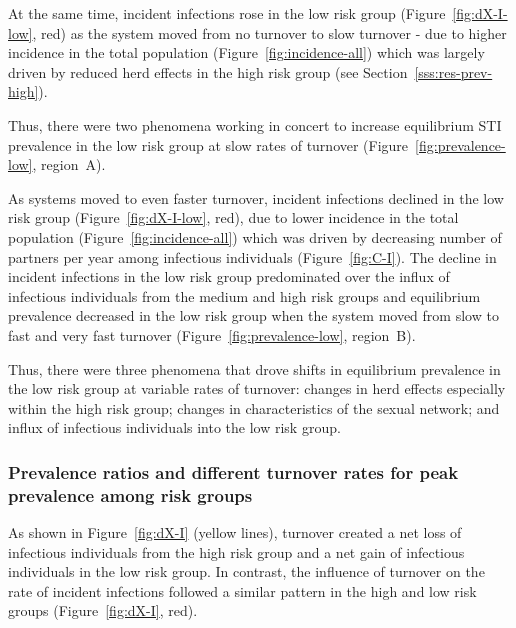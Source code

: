 
At the same time, incident
infections rose in the low risk group 
(Figure~\ref{fig:dX-I-low}, red) as the system moved from 
no turnover to slow turnover -
due to higher incidence in the total population (Figure~\ref{fig:incidence-all}) 
which was largely driven by  
reduced herd effects in the high risk group
(see Section~\ref{sss:res-prev-high}).

Thus, there were two phenomena working in concert
to increase equilibrium STI prevalence in the low risk group
at slow rates of turnover (Figure~\ref{fig:prevalence-low}, region~A).
\par
As systems moved to even faster turnover,
incident infections declined in 
the low risk group
(Figure~\ref{fig:dX-I-low}, red),		%
due to lower incidence in the total population
(Figure~\ref{fig:incidence-all}) 
which was driven by 
decreasing number of partners per year among infectious individuals
(Figure~\ref{fig:C-I}).
The decline in incident infections in the low
risk group predominated over the influx
of infectious individuals from the medium and high risk groups
and equilibrium prevalence decreased in the low risk group when 
the system moved from slow to fast and very fast turnover
(Figure~\ref{fig:prevalence-low}, region~B).  %

Thus, there were three phenomena that
drove shifts in equilibrium prevalence in the low risk group 
at variable rates of turnover: changes in herd effects especially within the high risk group;
changes in characteristics of the sexual network; and influx of infectious individuals 
into the low risk group.

\subsubsection{Prevalence ratios and different turnover rates for peak prevalence among risk groups}
As shown in Figure~\ref{fig:dX-I} (yellow lines), turnover created
a net loss of infectious individuals from the high risk group and
a net gain of infectious individuals in the low risk group.
In contrast, the influence of turnover on
the rate of incident infections followed a similar pattern			
in the high and low risk groups (Figure~\ref{fig:dX-I}, red).

